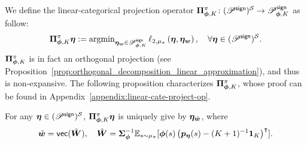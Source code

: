 We define the linear-categorical projection operator ${\bm{\Pi}}_{{\bm{\phi}}, K}^{\pi}\colon ({\mathscr{P}}^{\mathsf{sign}})^{{\mathcal{S}}}\to{\mathscr{P}}^{\mathsf{sign}}_{{\bm{\phi}},K}$ as follow:
\begin{equation*}
    {\bm{\Pi}}_{{\bm{\phi}}, K}^{\pi}\bm{\eta}:=\operatorname*{argmin}\nolimits_{\bm{\eta}_{{\bm{w}}}\in{\mathscr{P}}^{\mathsf{sign}}_{{\bm{\phi}},K}}\ell_{2,\mu_\pi}\left({\bm{\eta}, \bm{\eta}_{{\bm{w}}}}\right),\quad\forall\bm{\eta}\in ({\mathscr{P}}^{\mathsf{sign}})^{{\mathcal{S}}}.
\end{equation*}
${\bm{\Pi}}_{{\bm{\phi}}, K}^{\pi}$ is in fact an orthogonal projection (see Proposition~\ref{prop:orthogonal_decomposition_linear_approximation}), and thus is non-expansive.
The following proposition characterizes ${\bm{\Pi}}_{{\bm{\phi}}, K}^{\pi}$, whose proof can be found in Appendix~\ref{appendix:linear-cate-project-op}.
\begin{proposition}\label{prop:linear_projection}
For any $\bm{\eta}\in({\mathscr{P}}^{\mathsf{sign}})^{{\mathcal{S}}}$, ${\bm{\Pi}}_{{\bm{\phi}}, K}^{\pi}\bm{\eta}$ is uniquely give by $ \bm{\eta}_{\tilde{{\bm{w}}}}$, where
                    \begin{equation*}
      \tilde{{\bm{w}}}=\mathsf{vec}(\tilde{{\bm{W}}}),\quad \tilde{{\bm{W}}}={\bm{\Sigma}}_{{\bm{\phi}}}^{-1}{\mathbb E}_{s\sim\mu_{\pi}}[{\bm{\phi}}(s)\left({{\bm{p}}_{\bm{\eta}}(s)-(K+1)^{-1}\bm{1}_{K}}\right)^{\intercal}].
    \end{equation*}
\end{proposition}

